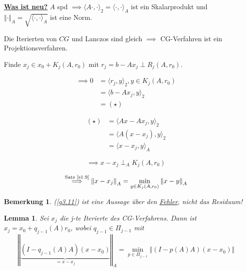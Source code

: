 \documentclass{book}
\newtheorem{lemma}[algorithm]{Lemma}
\newtheorem{remark}[algorithm]{Bemerkung}
\begin{document}
            \underline{\textbf{Was ist neu?}} $A$ spd $\implies \langle A\cdot,\cdot \rangle_2=\langle \cdot,\cdot \rangle_A$ ist ein Skalarprodukt und $\left\Vert \cdot \right\Vert_A = \sqrt{\langle \cdot,\cdot \rangle_A}$ ist eine Norm.

            Die Iterierten von $CG$ und Lanczos sind gleich $\implies $ CG-Verfahren ist ein Projektionsverfahren.

            Finde $x_j\in x_0+K_j(A,r_0)$ mit $r_j=b-Ax_j\perp R_j(A,r_0)$.

            \begin{align*}
                \implies 0 &= \langle r_j,y \rangle_2,y\in K_j(A,r_0)\\
                &=\langle b-Ax_j,y \rangle_2 \\
                &= (\star)
            \end{align*}

            \begin{align*}
                (\star)&=\langle Ax-Ax_j,y \rangle_2\\
                &= \langle A(x-x_j),y \rangle_2\\ 
                &= \langle x-x_j,y \rangle_A
            \end{align*}

            \begin{equation*}
                \implies x-x_j\perp_A K_j(A,r_0)
            \end{equation*}


            \begin{equation}\label{g3.11}
                \stackrel{\text{Satz \ref{s1.9}}}{\implies} \left\Vert x-x_j \right\Vert_A=\min_{y\in K_j(A,r_0)} \left\Vert x-y \right\Vert_A
            \end{equation}

            \begin{remark}\label{b3.31}
                (\ref{g3.11}) ist eine Aussage über den \underline{Fehler}, nicht das Residuum!
            \end{remark}

            \begin{lemma}\label{l3.32}
                Sei $x_j$ die j-te Iterierte des CG-Verfahrens. Dann ist $x_j=x_0 +q_{j-1}(A)r_0$, wobei $q_{j-1}\in \Pi_{j-1}$ mit 
                \begin{equation}
                    \left\Vert \underbrace{(I-q_{j-1}(A)A)(x-x_0)}_{=x-x_j} \right\Vert_A=\min_{p\in\Pi_{j-1}} \left\Vert (I-p(A)A)(x-x_0) \right\Vert
                \end{equation}
            \end{lemma}
\end{document}
